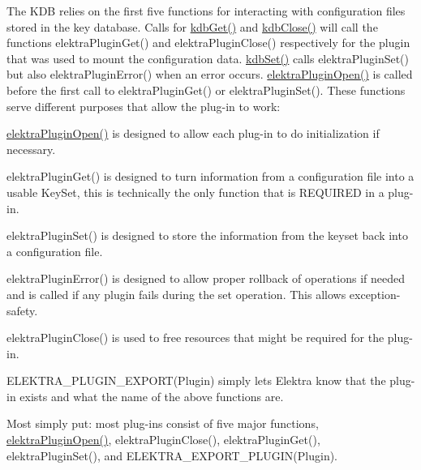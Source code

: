 The K\+D\+B relies on the first five functions for interacting with configuration files stored in the key database. Calls for \hyperlink{group__kdb_ga28e385fd9cb7ccfe0b2f1ed2f62453a1}{kdb\+Get()} and \hyperlink{group__kdb_gadb54dc9fda17ee07deb9444df745c96f}{kdb\+Close()} will call the functions elektra\+Plugin\+Get() and elektra\+Plugin\+Close() respectively for the plugin that was used to mount the configuration data. \hyperlink{group__kdb_ga11436b058408f83d303ca5e996832bcf}{kdb\+Set()} calls elektra\+Plugin\+Set() but also elektra\+Plugin\+Error() when an error occurs. \hyperlink{elektra_2plugin_8c_a32a70a7876542c51d153164ac5108a57}{elektra\+Plugin\+Open()} is called before the first call to elektra\+Plugin\+Get() or elektra\+Plugin\+Set(). These functions serve different purposes that allow the plug-\/in to work\+:


\begin{DoxyItemize}
\item \hyperlink{elektra_2plugin_8c_a32a70a7876542c51d153164ac5108a57}{elektra\+Plugin\+Open()} is designed to allow each plug-\/in to do initialization if necessary.
\item elektra\+Plugin\+Get() is designed to turn information from a configuration file into a usable Key\+Set, this is technically the only function that is R\+E\+Q\+U\+I\+R\+E\+D in a plug-\/in.
\item elektra\+Plugin\+Set() is designed to store the information from the keyset back into a configuration file.
\item elektra\+Plugin\+Error() is designed to allow proper rollback of operations if needed and is called if any plugin fails during the set operation. This allows exception-\/safety.
\item elektra\+Plugin\+Close() is used to free resources that might be required for the plug-\/in.
\item E\+L\+E\+K\+T\+R\+A\+\_\+\+P\+L\+U\+G\+I\+N\+\_\+\+E\+X\+P\+O\+R\+T(\+Plugin) simply lets Elektra know that the plug-\/in exists and what the name of the above functions are.
\end{DoxyItemize}

Most simply put\+: most plug-\/ins consist of five major functions, {\ttfamily \hyperlink{elektra_2plugin_8c_a32a70a7876542c51d153164ac5108a57}{elektra\+Plugin\+Open()}}, {\ttfamily elektra\+Plugin\+Close()}, {\ttfamily elektra\+Plugin\+Get()}, {\ttfamily elektra\+Plugin\+Set()}, and {\ttfamily E\+L\+E\+K\+T\+R\+A\+\_\+\+E\+X\+P\+O\+R\+T\+\_\+\+P\+L\+U\+G\+I\+N(\+Plugin)}.

